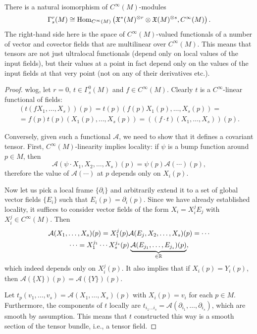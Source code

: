 \begin{thm}\label{thm tensor characterization}
    There is a natural isomorphism of $C^\infty (M)$-modules
    \[
    \Gamma^r_s(M)\cong \operatorname{Hom}_{C^\infty(M)}\left( \mathfrak{X}^\ast(M)^{\otimes r}\otimes \mathfrak{X}(M)^{\otimes s},C^\infty(M)\right).
    \]
    The right-hand side here is the space of $C^\infty(M)$-valued functionals of a number of vector and covector fields that are multilinear over $C^\infty(M)$. This means that tensors are not just ultralocal functionals (depend only on local values of the input fields), but their values at a point in fact depend only on the values of the input fields at that very point (not on any of their derivatives etc.).
\end{thm}
\begin{proof}
    \gls{wlog}, let $r=0$, $t\in \Gamma^0_s(M)$ and $f\in C^\infty (M)$. Clearly $t$ is a $C^\infty$-linear functional of fields:
    \begin{multline}
         (t(fX_1,\ldots,X_s))(p)=t(p)(f(p)X_1(p),\ldots,X_s(p))=\\=f(p)t(p)(X_1(p),\ldots,X_s(p))=((f\cdot t)(X_1,\ldots,X_s))(p).
    \end{multline}

    Conversely, given such a functional $\mathcal{A}$, we need to show that it defines a covariant tensor. First, $C^\infty(M)$-linearity implies locality: if $\psi$ is a bump function around $p\in M$, then \[\mathcal{A}(\psi\cdot X_1,X_2,\ldots, X_s)(p)=\psi(p)\mathcal{A}(\cdots)(p),\] therefore the value of $\mathcal{A}(\cdots)$ at $p$ depends only on $X_i(p)$.

    Now let us pick a local frame $\{\partial_i\}$ and arbitrarily extend it to a set of global vector fields $\{E_i\}$ such that $E_i(p)=\partial_i(p)$. Since we have already established locality, it suffices to consider vector fields of the form $X_i=X^j_i E_j$ with $X^j_i\in C^\infty(M)$. Then
    \begin{multline}
        \mathcal{A}(X_1,\ldots,X_s)(p)=X^j_1(p)\mathcal{A}(E_j,X_2,\ldots,X_s)(p)=\cdots\\ \cdots=X_1^{j_1}\cdots X_s^{j_s}(p)\underbrace{\mathcal{A}(E_{j_1},\ldots,E_{j_s})(p)}_{\in\mathbb{R} },
    \end{multline}
    which indeed depends only on $X_i^j(p)$. It also implies that if $X_i(p)=Y_i(p)$, then $\mathcal{A}(\{X\})(p)=\mathcal{A}(\{Y\})(p)$.

    Let $t_p (v_1,\ldots,v_s)=\mathcal{A}(X_1,\ldots,X_s)(p)$ with $X_i(p)=v_i$ for each $p\in M$. Furthermore, the components of $t$ locally are $t_{i_1\ldots i_s}=\mathcal{A}(\partial_{i_1},\ldots,\partial_{i_s})$, which are smooth by assumption. This means that $t$ constructed this way is a smooth section of the tensor bundle, i.e., a tensor field.
\end{proof}

